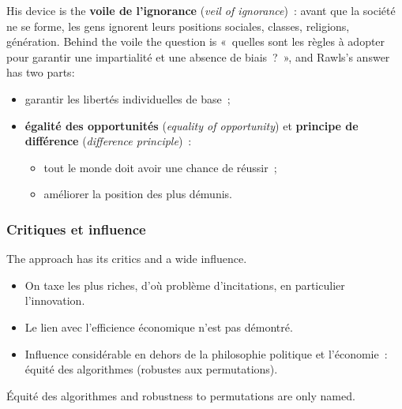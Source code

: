 His device is the \textbf{voile de l'ignorance} (\textit{veil of ignorance})~: avant
que la société ne se forme, les gens ignorent leurs positions sociales, classes,
religions, génération. Behind the voile the question is «~quelles sont les règles à
adopter pour garantir une impartialité et une absence de biais~?~», and Rawls's
answer has two parts:
\begin{itemize}
  \item garantir les libertés individuelles de base~;
  \item \textbf{égalité des opportunités} (\textit{equality of opportunity}) et
    \textbf{principe de différence} (\textit{difference principle})~:
    \begin{itemize}
      \item tout le monde doit avoir une chance de réussir~;
      \item améliorer la position des plus démunis.
    \end{itemize}
\end{itemize}

\subsubsection{Critiques et influence}

The approach has its critics and a wide influence.
\begin{itemize}
  \item On taxe les plus riches, d'où problème d'incitations, en particulier
    l'innovation.
  \item Le lien avec l'efficience économique n'est pas démontré.
  \item Influence considérable en dehors de la philosophie politique et
    l'économie~: équité des algorithmes (robustes aux permutations).
\end{itemize}
Équité des algorithmes and robustness to permutations are only named.
